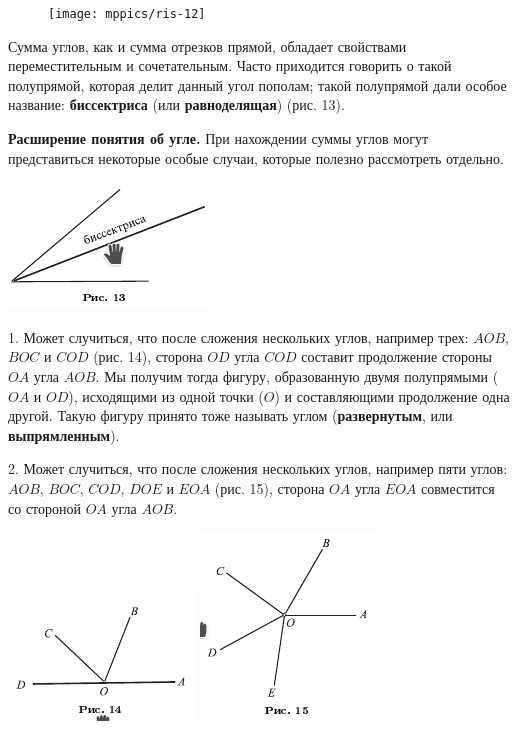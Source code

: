 \documentclass[oneside]{book}
\begin{document}
\begin{figure}[h]
\begin{center}
\texttt{[image: mppics/ris-12]}
\caption{}
\end{center}
\end{figure}

Сумма углов, как и сумма отрезков прямой, обладает свойствами переместительным и сочетательным.
Часто приходится говорить о такой полупрямой, которая делит данный угол пополам;
такой полупрямой дали особое название:
\textbf{биссектриса} (или \textbf{равноделящая}) (рис. 13).


\textbf{Расширение понятия об угле.}
При нахождении суммы углов могут представиться некоторые особые случаи, которые полезно рассмотреть отдельно.

\includegraphics{pics/ris-13}

1.
Может случиться, что после сложения нескольких углов, например трех:
$AOB$, $BOC$ и $COD$ (рис. 14), сторона $OD$ угла $COD$ составит продолжение стороны $OA$ угла $AOB$.
Мы получим тогда фигуру, образованную двумя полупрямыми ($OA$ и $OD$), исходящими из одной точки ($O$) и составляющими продолжение одна другой.
Такую фигуру принято тоже называть углом (\textbf{развернутым}, или \textbf{выпрямленным}).

2.
Может случиться, что после сложения нескольких углов, например пяти углов:
$AOB$, $BOC$, $COD$, $DOE$ и $EOA$ (рис. 15), сторона $OA$ угла $EOA$ совместится со стороной $OA$ угла $AOB$.

\includegraphics{pics/ris-14}
\includegraphics{pics/ris-15}
\end{document}
